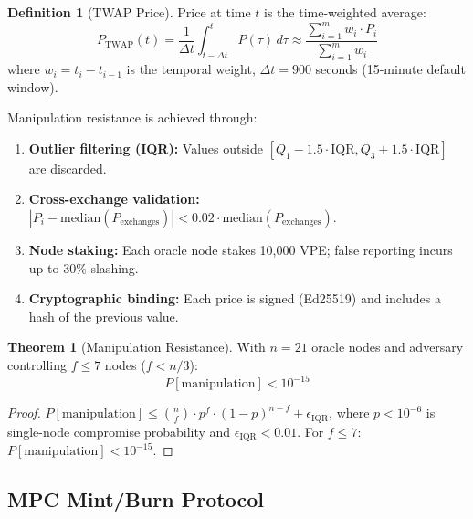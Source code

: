 \documentclass[12pt,a4paper]{article}
\theoremstyle{definition}
\newtheorem{definition}{Definition}[section]
\newtheorem{theorem}{Theorem}[section]
\theoremstyle{remark}
\DeclareMathOperator{\TWAP}{TWAP}
\begin{document}
\begin{definition}[TWAP Price]
Price at time $t$ is the time-weighted average:
\begin{equation}
P_{\TWAP}(t) = \frac{1}{\Delta t} \int_{t - \Delta t}^{t} P(\tau)\, d\tau \approx \frac{\sum_{i=1}^{m} w_i \cdot P_i}{\sum_{i=1}^{m} w_i}
\end{equation}
where $w_i = t_i - t_{i-1}$ is the temporal weight, $\Delta t = 900$ seconds (15-minute default window).
\end{definition}

Manipulation resistance is achieved through:
\begin{enumerate}[nosep]
    \item \textbf{Outlier filtering (IQR):} Values outside $[Q_1 - 1.5 \cdot \text{IQR}, Q_3 + 1.5 \cdot \text{IQR}]$ are discarded.
    \item \textbf{Cross-exchange validation:} $|P_i - \text{median}(P_{\text{exchanges}})| < 0.02 \cdot \text{median}(P_{\text{exchanges}})$.
    \item \textbf{Node staking:} Each oracle node stakes 10,000 VPE; false reporting incurs up to 30\% slashing.
    \item \textbf{Cryptographic binding:} Each price is signed (Ed25519) and includes a hash of the previous value.
\end{enumerate}

\begin{theorem}[Manipulation Resistance]
\label{thm:manipulation-resistance}
With $n = 21$ oracle nodes and adversary controlling $f \leq 7$ nodes ($f < n/3$):
\begin{equation}
P[\text{manipulation}] < 10^{-15}
\end{equation}
\end{theorem}

\begin{proof}
$P[\text{manipulation}] \leq \binom{n}{f} \cdot p^f \cdot (1-p)^{n-f} + \epsilon_{\text{IQR}}$, where $p < 10^{-6}$ is single-node compromise probability and $\epsilon_{\text{IQR}} < 0.01$. For $f \leq 7$: $P[\text{manipulation}] < 10^{-15}$.
\end{proof}

\subsection{MPC Mint/Burn Protocol}
\end{document}
